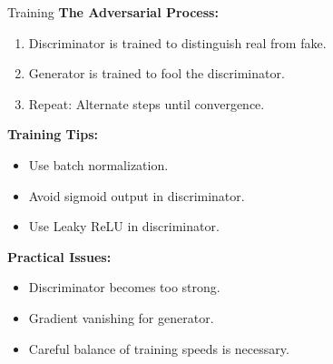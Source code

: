 \begin{frame}[allowframebreaks]{Training}
\framebreak
\textbf{The Adversarial Process:}
\begin{enumerate}
    \item Discriminator is trained to distinguish real from fake.
    \item Generator is trained to fool the discriminator.
    \item Repeat: Alternate steps until convergence.
\end{enumerate}

\textbf{Training Tips:}
\begin{itemize}
    \item Use batch normalization.
    \item Avoid sigmoid output in discriminator.
    \item Use Leaky ReLU in discriminator.
\end{itemize}

\textbf{Practical Issues:}
\begin{itemize}
    \item Discriminator becomes too strong.
    \item Gradient vanishing for generator.
    \item Careful balance of training speeds is necessary.
\end{itemize}
    
\end{frame}